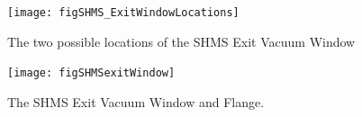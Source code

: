 \begin{figure}
\begin{center}
\texttt{[image: figSHMS\_ExitWindowLocations]}
\caption{The two possible locations of the SHMS Exit Vacuum Window \label{fig:shms_exit_window_locations}}
\end{center}
\end{figure}

\begin{figure}
\begin{center}
\texttt{[image: figSHMSexitWindow]}
\caption{The SHMS Exit Vacuum Window and Flange. \label{fig:shms_exit_window}}
\end{center}
\end{figure}
